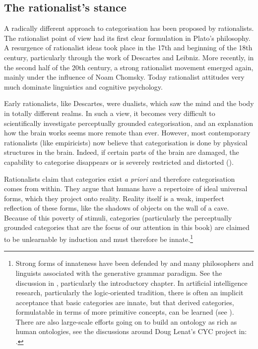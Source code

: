 \subsection{The rationalist's stance}

A radically different approach to categorisation has been 
proposed by rationalists. 
The rationalist point of view had its first clear formulation 
in Plato's philosophy. A resurgence of rationalist ideas
took place in the 17th and beginning of the
18th century, particularly through the work of 
Descartes and Leibniz. More recently, in the second half of
the 20th century, a strong rationalist movement
emerged again, mainly under the influence of Noam
Chomsky. Today rationalist attitudes very much 
dominate linguistics and cognitive psychology. 

Early rationalists, like Descartes, were dualists, which
saw the mind and the body in totally different realms. 
In such a view, it becomes very difficult to scientifically investigate 
perceptually grounded categorisation, and an explanation 
how the brain works seems more remote than ever. However, 
most contemporary rationalists (like empiricists)
now believe that categorisation
is done by physical structures in the brain. Indeed, 
if certain parts of the brain are damaged, the capability 
to categorise disappears or is severely restricted and 
distorted (\citealt{Deacon:1998}). 

Rationalists claim that categories 
exist {\itshape a priori} and therefore categorisation comes from
within. They argue that humans have a repertoire of ideal universal
forms, which they project
onto reality. Reality itself is a weak, imperfect 
reflection of these forms, like the shadows of objects
on the wall of a cave. Because of this poverty of stimuli, 
categories (particularly the perceptually grounded
categories that are the focus of our attention in this 
book) are claimed to be unlearnable by induction and must
therefore be innate.\footnote{
Strong forms of innateness have been defended by 
\cite{Fodor:1983}
and many philosophers and linguists associated with the 
generative grammar paradigm. See the discussion in
\cite{Wierzbicka:1992}, particularly the introductory chapter. 
In artificial intelligence 
research, particularly the logic-oriented tradition, there
is often an implicit acceptance that basic categories 
are innate, but that derived categories, formulatable
in terms of more primitive concepts, can be learned
(see \citealt{McCarthy:2008}). There are also 
large-scale efforts going on to build an ontology as 
rich as human ontologies, see the discussions around
Doug Lenat's CYC project in: \cite{Steels:1994}.}

